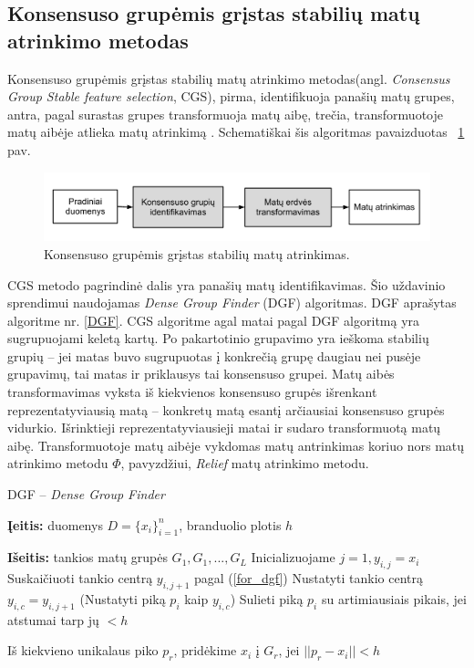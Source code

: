 \subsection{Konsensuso grupėmis grįstas stabilių matų atrinkimo metodas}

Konsensuso grupėmis grįstas stabilių matų atrinkimo metodas(angl. \textit{Consensus Group Stable feature selection}, CGS), pirma, identifikuoja panašių matų grupes, antra, pagal surastas grupes transformuoja matų aibę, trečia, transformuotoje matų aibėje atlieka matų atrinkimą \cite{loscalzo2009consensus}. Schematiškai šis algoritmas pavaizduotas ~\ref{fig:figure7} pav. 
\begin{figure}
 \centering
 \includegraphics[width=\textwidth]{../bachelor/images/consensus_group_based_feature_selection_framework.pdf}
 \caption{Konsensuso grupėmis grįstas stabilių matų atrinkimas.}
 \label{fig:figure7}
\end{figure}

CGS metodo pagrindinė dalis yra panašių matų identifikavimas. Šio uždavinio sprendimui naudojamas \textit{Dense Group Finder} (DGF) algoritmas. DGF aprašytas algoritme nr. \ref{DGF}. CGS algoritme agal matai pagal DGF algoritmą yra sugrupuojami keletą kartų. Po pakartotinio grupavimo yra ieškoma stabilių grupių -- jei matas buvo sugrupuotas į konkrečią grupę daugiau nei pusėje grupavimų, tai matas ir priklausys tai konsensuso grupei. Matų aibės transformavimas vyksta iš kiekvienos konsensuso grupės išrenkant reprezentatyviausią matą -- konkretų matą esantį arčiausiai konsensuso grupės vidurkio. Išrinktieji reprezentatyviausieji matai ir sudaro transformuotą matų aibę. Transformuotoje matų aibėje vykdomas matų antrinkimas koriuo nors matų atrinkimo metodu $\Phi$, pavyzdžiui, \textit{Relief} matų atrinkimo metodu. 
\begin{algorithm}
\caption{DGF -- \textit{Dense Group Finder}}
\label{DGF}
 \begin{algorithmic}
 \item \textbf{Įeitis:} duomenys $D=\{x_i\}_{i=1}^n$, branduolio plotis $h$
 \item \textbf{Išeitis:} tankios matų grupės $G_1, G_1,..., G_L$
  \State Inicializuojame $j=1, y_{i,j}=x_i$
  \Repeat
    \State Suskaičiuoti tankio centrą $y_{i, j+1}$ pagal (\ref{for_dgf})
  \State Nustatyti tankio centrą $y_{i,c} = y_{i,j+1}$ (Nustatyti piką $p_i$ kaip $y_{i,c}$)
  \State Sulieti piką $p_i$ su artimiausiais pikais, jei atstumai tarp jų $ < h$
 \EndFor
 \item Iš kiekvieno unikalaus piko $p_r$, pridėkime $x_i$ į $G_r$, jei $||p_r - x_i|| < h$
 \end{algorithmic}
\end{algorithm}


